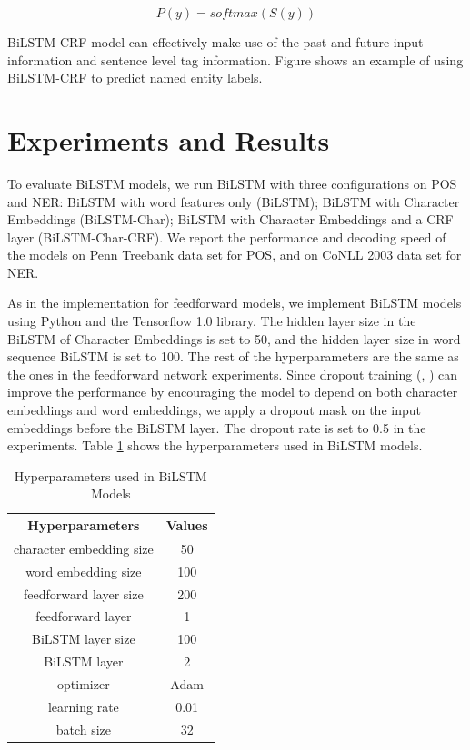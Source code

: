 \begin{equation}\label{eqn:softmax}
P\left( y\right) = \textit{softmax}(S\left( y\right))
\end{equation}

BiLSTM-CRF model can effectively make use of the past and future input information and sentence level tag information. Figure shows an example of using BiLSTM-CRF to predict named entity labels.
 
\section{Experiments and Results}

To evaluate BiLSTM models, we run BiLSTM with three configurations on POS and NER: BiLSTM with word features only (BiLSTM); BiLSTM with Character Embeddings (BiLSTM-Char); BiLSTM with Character Embeddings and a CRF layer (BiLSTM-Char-CRF). We report the performance and decoding speed of the models on Penn Treebank data set for POS, and on CoNLL 2003 data set for NER. 

As in the implementation for feedforward models, we implement BiLSTM models using Python and the Tensorflow 1.0 library. The hidden layer size in the BiLSTM of Character Embeddings is set to 50, and the hidden layer size in word sequence BiLSTM is set to 100. The rest of the hyperparameters are the same as the ones in the feedforward network experiments. Since dropout training (\citeauthor{hinton2012improving}, \citeyear{hinton2012improving}) can improve the performance by encouraging the model to depend on both character embeddings and word embeddings, we apply a dropout mask on the input embeddings before the BiLSTM layer. The dropout rate is set to 0.5 in the experiments. Table \ref{table:hyperparameters2} shows the hyperparameters used in BiLSTM models.

\begin{table}[]
\centering
\caption{Hyperparameters used in BiLSTM Models}
\label{table:hyperparameters2}
\begin{tabular}{|c|c|}
\hline
Hyperparameters & Values \\ \hline
character embedding size & 50 \\ \hline
word embedding size & 100 \\ \hline
feedforward layer size & 200 \\ \hline
feedforward layer & 1 \\ \hline
BiLSTM layer size & 100 \\ \hline
BiLSTM layer & 2 \\ \hline 
optimizer & Adam \\ \hline
learning rate & 0.01 \\ \hline
batch size & 32 \\ \hline
\end{tabular}
\end{table}

